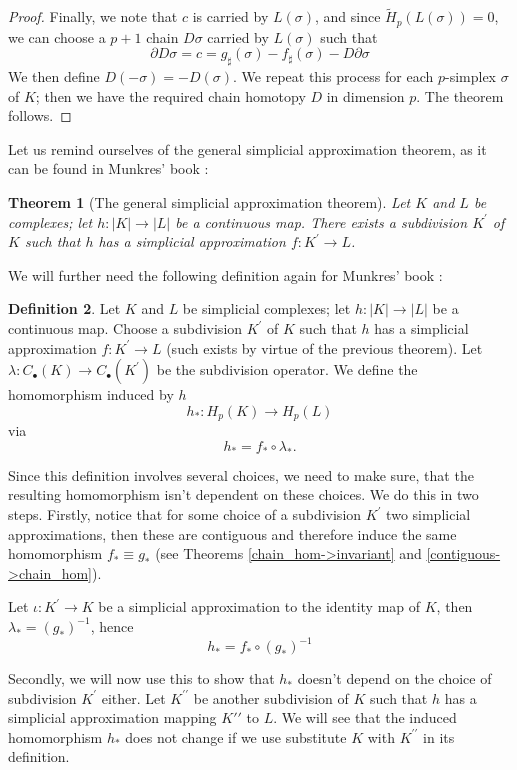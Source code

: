 \documentclass[draft,toc=bib]{scrartcl}
\theoremstyle{plain}
\newtheorem{theorem}{Theorem}[section]
\theoremstyle{definition}
\newtheorem	{definition}[theorem]{Definition}
\theoremstyle{remark}
\newcommand{\pprime}{{\prime\prime}}
\begin{document}
\begin{proof}
Finally, we note that $c$ is carried by $L(\sigma)$, and since $\tilde{H}_p(L(\sigma))=0$, we can choose a $p+1$ chain $D\sigma$ carried by $L(\sigma)$ such that 
\[
\partial D\sigma=c=g_\sharp(\sigma)-f_\sharp(\sigma)-D\partial\sigma
\]
We then define $D(-\sigma)=-D(\sigma)$. We repeat this process for each $p$-simplex $\sigma$ of $K$; then we have the required chain homotopy $D$ in dimension $p$. The theorem follows.
\end{proof}

Let us remind ourselves of the general simplicial approximation theorem, as it can be found in Munkres' book \cite[Thm. 16.5, p. 85]{mu}:

\begin{theorem}[The general simplicial approximation theorem]
	Let $K$ and $L$ be complexes; let $h: |K|\to |L|$ be a continuous map. There exists a subdivision $K^\prime$ of $K$ such that $h$ has a simplicial approximation $f:K^\prime \to L$.
\end{theorem}

We will further need the following definition again for Munkres' book \cite[p. 100]{mu}:
\begin{definition}
	Let $K$ and $L$ be simplicial complexes; let $h:|K|\to |L|$ be a continuous map. Choose a subdivision $K^\prime$ of $K$ such that $h$ has a simplicial approximation $f:K^\prime\to L$ (such exists by virtue of the previous theorem). Let $\lambda:C_\bullet(K)\to C_\bullet(K^\prime)$ be the subdivision operator. We define the homomorphism induced by $h$ 
	\[
	h_\ast: H_p(K)\to H_p(L)
	\]
	via
	\[
	h_\ast=f_\ast\circ \lambda_\ast.
	\]
\end{definition}


Since this definition involves several choices, we need to make sure, that the resulting homomorphism isn't dependent on these choices. We do this in two steps. Firstly, notice that for some choice of a subdivision $K^\prime$ two simplicial approximations, then these are contiguous and therefore induce the same homomorphism $f_\ast\equiv g_\ast$ (see Theorems \ref{chain_hom->invariant} and \ref{contiguous->chain_hom}).

Let $\iota: K^\prime\to K $ be a simplicial approximation to the identity map of $K$, then $\lambda_\ast=(g_\ast)^{-1}$, hence
\[
h_\ast=f_\ast\circ(g_\ast)^{-1}
\]

Secondly, we will now use this to show that $h_\ast$ doesn't depend on the choice of subdivision $K^\prime$ either. Let $K^\pprime$ be another subdivision of $K$ such that $h$ has a simplicial approximation mapping $K\pprime$ to $L$. We will see that the induced homomorphism $h_\ast$ does not change if we use substitute $K$ with $K^\pprime$ in its definition.
\end{document}
